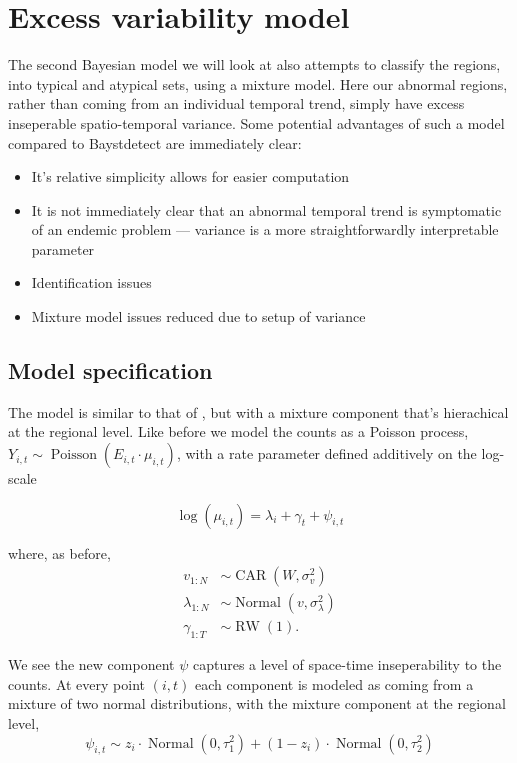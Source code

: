 \documentclass[11pt]{report}
\begin{document}
\chapter{Excess variability model}

The second Bayesian model we will look at also attempts to classify the regions, into typical and atypical sets, using a mixture model. Here our abnormal regions, rather than coming from an individual temporal trend, simply have excess inseperable spatio-temporal variance. Some potential advantages of such a model compared to Baystdetect are immediately clear:
\begin{itemize}
\item It's relative simplicity allows for easier computation
\item It is not immediately clear that an abnormal temporal trend is symptomatic of an endemic problem --- variance is a more straightforwardly interpretable parameter
\item Identification issues
\item Mixture model issues reduced due to setup of variance
\end{itemize}

\section{Model specification}

The model is similar to that of \citet{stability}, but with a mixture component that's hierachical at the regional level. Like before we model the counts as a Poisson process, $Y_{i,t} \sim \operatorname{Poisson}(E_{i,t} \cdot \mu_{i,t})$, with a rate parameter defined additively on the log-scale

\begin{equation}
\log(\mu_{i,t}) = \lambda_i + \gamma_t + \psi_{i,t}
\end{equation}

where, as before,
\begin{align}
v_{1:N} &\sim \operatorname{CAR}(W, \sigma_v^2) \\
\lambda_{1:N} &\sim \operatorname{Normal}(v, \sigma_\lambda^2) \\
\gamma_{1:T} &\sim \operatorname{RW}(1).
\end{align}

We see the new component $\psi$ captures a level of space-time inseperability to the counts. At every point $(i, t)$ each component is modeled as coming from a mixture of two normal distributions, with the mixture component at the regional level,
\begin{equation}
\psi_{i,t} \sim z_i \cdot \operatorname{Normal}(0, \tau_1^2) + (1 - z_i) \cdot \operatorname{Normal}(0, \tau_2^2)
\end{equation} 
\end{document}
